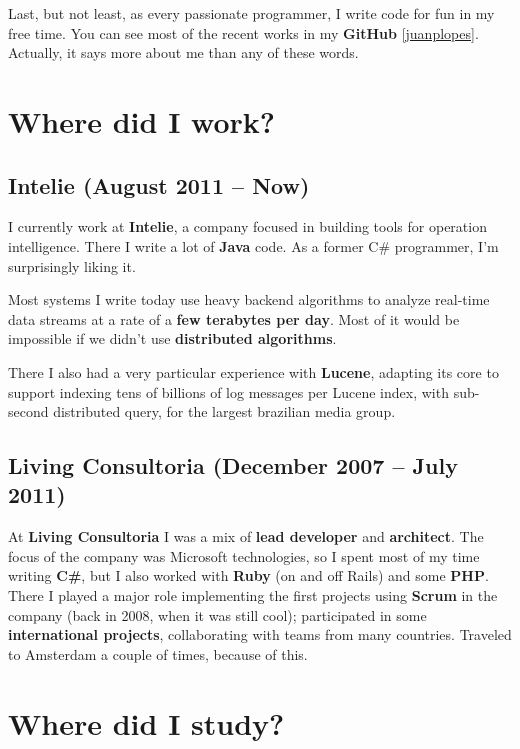 \documentclass[a4paper,12pt,oneside]{article}
\begin{document}
	Last, but not least, as every passionate programmer, I write code for fun in my
	free time. You can see most of the recent works in my \textbf{GitHub}
	[\href{http://github.com/juanplopes}{juanplopes}]. Actually, it says more about
	me than any of these words.

\section*{Where did I work?}

\subsection*{Intelie \small{ (August 2011 -- Now)}}

	I currently work at \textbf{Intelie}, a company focused in building tools for
	operation intelligence. There I write a lot of \textbf{Java} code. As a former
	C\# programmer, I'm surprisingly liking it.

	Most systems I write today use heavy backend algorithms to analyze real-time
	data streams at a rate of a \textbf{few terabytes per day}. Most of it would be
	impossible if we didn't use \textbf{distributed algorithms}.

	There I also had a very particular experience with \textbf{Lucene}, adapting
	its core to support indexing tens of billions of log messages per Lucene
	index, with sub-second distributed query, for the largest brazilian media
	group.
\subsection*{Living Consultoria \small{ (December 2007 -- July 2011)}}

	At \textbf{Living Consultoria} I was a mix of \textbf{lead developer} and
	\textbf{architect}. The focus of the company was Microsoft technologies, so I
	spent most of my time writing \textbf{C\#}, but I also worked with
	\textbf{Ruby} (on and off Rails) and some \textbf{PHP}. There I played a major
	role implementing the first projects using \textbf{Scrum} in the company (back
	in 2008, when it was still cool); participated in some \textbf{international
	projects}, collaborating with teams from many countries. Traveled to Amsterdam
	a couple of times, because of this.

\section*{Where did I study?}
\end{document}
